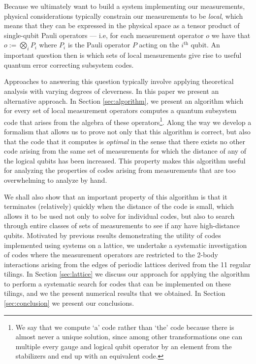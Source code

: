 \documentclass[12pt]{amsbook}
\theoremstyle{plain}
\theoremstyle{definition}
\theoremstyle{remark}
\begin{document}
Because we ultimately want to build a system implementing our measurements, physical considerations typically constrain our measurements to be \emph{local}, which means that they can be expressed in the physical space as a tensor product of single-qubit Pauli operators --- i.e, for each measurement operator $o$ we have that
$o := \bigotimes_i P_i$ where $P_i$ is the Pauli operator $P$ acting on the $i^{\text{th}}$ qubit.  An important question then is which sets of local measurements give rise to useful quantum error correcting subsystem codes.

Approaches to answering this question typically involve applying theoretical analysis with varying degrees of cleverness.  In this paper we present an alternative approach.  In Section \ref{sec:algorithm}, we present an algorithm which for every set of local measurement operators computes a quantum subsystem code that arises from the algebra of these operators\footnote{We say that we compute `a' code rather than `the' code because there is almost never a unique solution, since among other transformations one can multiple every gauge and logical qubit operator by an element from the stabilizers and end up with an equivalent code.}.  Along the way we develop a formalism that allows us to prove not only that this algorithm is correct, but also that the code that it computes is \emph{optimal} in the sense that there exists no other code arising from the same set of measurements for which the distance of any of the logical qubits has been increased.  This property makes this algorithm useful for analyzing the properties of codes arising from measurements that are too overwhelming to analyze by hand.  

We shall also show that an important property of this algorithm is that it terminates (relatively) quickly when the distance of the code is small, which allows it to be used not only to solve for individual codes, but also to search through entire classes of sets of measurements to see if any have high-distance qubits.  Motivated by previous results demonstrating the utility of codes implemented using systems on a lattice, we undertake a systematic investigation of codes where the measurement operators are restricted to the 2-body interactions arising from the edges of periodic lattices derived from the 11 regular tilings.  In Section \ref{sec:lattice} we discuss our approach for applying the algorithm to perform a systematic search for codes that can be implemented on these tilings, and we the present numerical results that we obtained. In Section \ref{sec:conclusion} we present our conclusions.
\end{document}
